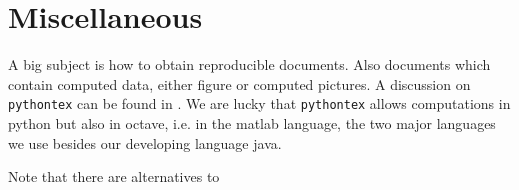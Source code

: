\documentclass[12pt]{article}
\begin{document}
\section{Miscellaneous}\label{sec:misc}

A big subject is how to obtain reproducible documents. 
Also documents which contain computed data, either figure or computed pictures. 
A discussion on \texttt{pythontex} can be found in \cite{Poo15}. 
We are lucky that \texttt{pythontex} allows computations in python but also in octave, i.e. in the matlab language,  
the two major languages we use besides our developing language java. 

Note that there are alternatives to 


\end{document}
